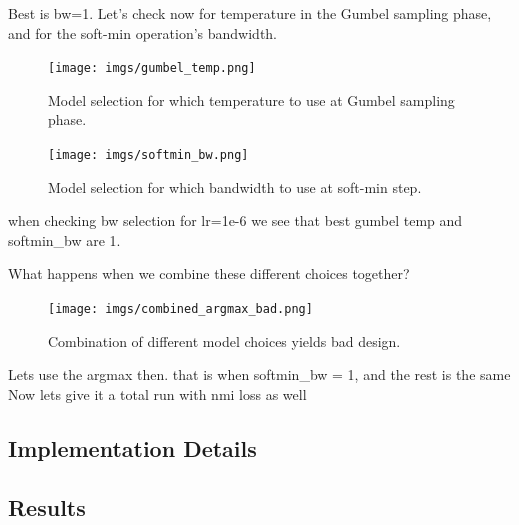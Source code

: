 Best is bw=1.
Let's check now for temperature in the Gumbel sampling phase, and for the soft-min operation's bandwidth.

\begin{figure}
\centering
\texttt{[image: imgs/gumbel\_temp.png]}
\caption{\label{fig:gd_clust_good} Model selection for which temperature to use at Gumbel sampling phase.}
\end{figure}

\begin{figure}
\centering
\texttt{[image: imgs/softmin\_bw.png]}
\caption{\label{fig:gd_clust_good} Model selection for which bandwidth to use at soft-min step.}
\end{figure}

when checking bw selection for lr=1e-6 we see that best gumbel temp and softmin_bw are 1.

What happens when we combine these different choices together?

\begin{figure}
\centering
\texttt{[image: imgs/combined\_argmax\_bad.png]}
\caption{\label{fig:gd_clust_good} Combination of different model choices yields bad design.}
\end{figure}

Lets use the argmax then. that is when softmin_bw = 1, and the rest is the same
Now lets give it a total run with nmi loss as well


\subsection{Implementation Details}
\subsection{Results}
